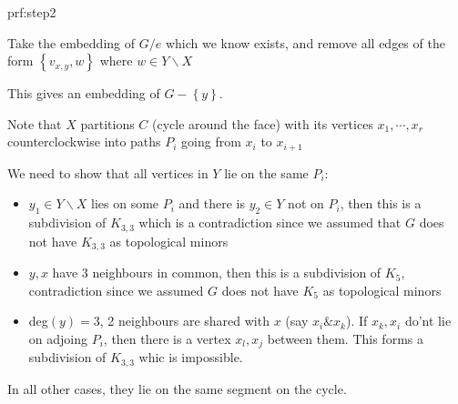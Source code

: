 \begin{prf}[Step 2]{prf:step2}
  \par\bigskip
  \noindent Take the embedding of $G/e$ which we know exists, and remove all edges of the form $\left\{v_{x,y}, w\right\}$ where $w\in Y\backslash X$ 
  \par\bigskip
\noindent This gives an embedding of $G-\left\{y\right\}$.
\par\bigskip
\noindent Note that $X$ partitions $C$ (cycle around the face) with its vertices $x_1,\cdots,x_r$ counterclockwise into paths $P_i$ going from $x_i$ to $x_{i+1}$
\par\bigskip
\noindent We need to show that all vertices in $Y$ lie on the same $P_i$:\par
\begin{itemize}
  \item $y_1\in Y\backslash X$ lies on some $P_i$ and there is $y_2\in Y$ not on $P_i$, then this is a subdivision of $K_{3,3}$ which is a contradiction since we assumed that $G$ does not have $K_{3,3}$ as topological minors\par
  \item $y,x$ have 3 neighbours in common, then this is a subdivision of $K_5$, contradiction since we assumed $G$ does not have $K_5$ as topological minors\par
  \item deg$(y) = 3$, 2 neighbours are shared with $x$ (say $x_i\& x_k$). If $x_k,x_i$ do'nt lie on adjoing $P_i$, then there is a vertex $x_l,x_j$ between them. This forms a subdivision of $K_{3,3}$ whic is impossible.
\end{itemize}
\par\bigskip
\noindent In all other cases, they lie on the same segment on the cycle.
\end{prf}
